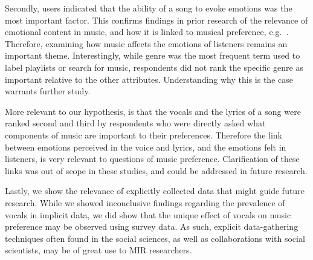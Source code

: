 \documentclass{article}
\begin{document}
Secondly, users indicated that the ability of a song to evoke emotions was the most important factor.
This confirms findings in prior research of the relevance of emotional content in music, and how it is linked to musical preference, e.g.~\cite{krumhansl2017listening}.
Therefore, examining how music affects the emotions of listeners remains an important theme.
Interestingly, while genre was the most frequent term used to label playlists or search for music, respondents did not rank the specific genre as important relative to the other attributes.
Understanding why this is the case warrants further study.

More relevant to our hypothesis, is that the vocals and the lyrics of a song were ranked second and third by respondents who were directly asked what components of music are important to their preferences.
Therefore the link between emotions perceived in the voice and lyrics, and the emotions felt in listeners, is very relevant to questions of music preference.
Clarification of these links was out of scope in these studies, and could be addressed in future research.

Lastly, we show the relevance of explicitly collected data that might guide future research.
While we showed inconclusive findings regarding the prevalence of vocals in implicit data, we did show that the unique effect of vocals on music preference may be observed using survey data.
As such, explicit data-gathering techniques often found in the social sciences, as well as collaborations with social scientists, may be of great use to MIR researchers.



\end{document}
